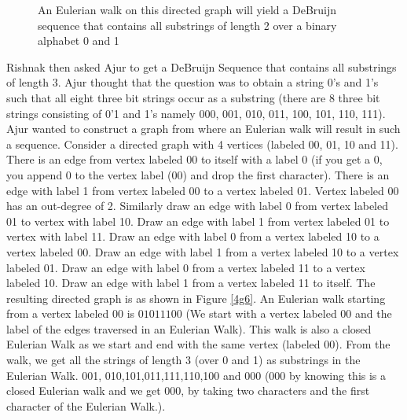 \begin{figure}
\begin{center}
\caption{ An Eulerian walk on this directed graph will yield a DeBruijn sequence that contains  all substrings of length 2 over a binary alphabet 0 and 1}\label{4g55}
\end{center}
\end{figure}
Rishnak then asked Ajur to get a DeBruijn Sequence that contains all substrings of length 3.
Ajur thought that the question was to obtain a string 0's and 1's such that all eight three bit strings occur as a substring (there are 8 three bit strings consisting of 0'1 and 1's namely 000, 001, 010, 011, 100, 101, 110, 111). Ajur wanted to construct a graph from where an Eulerian walk will result in such a sequence.  Consider a directed graph with 4 vertices (labeled 00, 01, 10 and 11).
There is an edge from vertex labeled 00 to itself with a label 0 (if you get a 0, you append 0 to the vertex label (00) and drop the first character). There is an edge with label 1 from
vertex labeled 00 to a vertex labeled 01. Vertex labeled 00 has an out-degree of 2. Similarly draw an edge with label 0 from vertex labeled 01 to vertex with label 10. Draw an edge with label 1 from vertex labeled 01 to vertex with label 11. 
Draw an edge with label 0 from a  vertex labeled 10 to a vertex labeled 00. Draw an edge with label 1 from a vertex labeled 10 to a vertex labeled 01.
Draw an edge with label 0 from a vertex labeled 11 to a vertex labeled 10. Draw an edge with label 1 from a vertex labeled 11 to itself.
The resulting directed graph is as shown in Figure \ref{4g6}. An Eulerian walk starting from a vertex labeled 00 is $0 1 0 1 1 1 0 0$  (We start with a vertex labeled 00 and the label of the edges traversed in an Eulerian Walk). This walk is also a closed Eulerian Walk as we start and end with the same vertex (labeled $00$).
From the walk, we get all the strings of length 3 (over 0 and 1) as substrings in the Eulerian Walk.
001, 010,101,011,111,110,100 and 000 (000 by knowing this is a closed Eulerian walk and we get 000, by taking two characters and the first character of the Eulerian Walk.).

